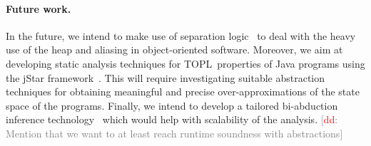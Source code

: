 \documentclass[10pt]{llncs} %
\newcommand{\TPL}{TOPL}
\newcommand{\noterg}[2]{\textcolor{gray}{[\textcolor{red}{#1}: #2]}}
\newcommand{\dd}[1]{\noterg{dd}{#1}}
\newcommand{\dinocomment}[1]{\dd{#1}}
\begin{document}
\paragraph{Future work.}
In the future, we intend to make use of separation logic~\cite{reynolds2002} to deal with the heavy use of the heap and aliasing in object-oriented software. Moreover, we aim at developing static analysis techniques for \TPL \ properties of Java programs using the jStar framework~\cite{DBLP:conf/oopsla/DistefanoP08}.
This will require investigating suitable abstraction techniques for obtaining meaningful and precise over-approximations of the state space of the programs.
Finally, we intend to develop a tailored bi-abduction inference technology~\cite{dblp:conf/popl/CalcagnoDOY09} which would help with scalability of the analysis.
\dinocomment{Mention that we want to at least reach runtime soundness with abstractions}





\end{document}
